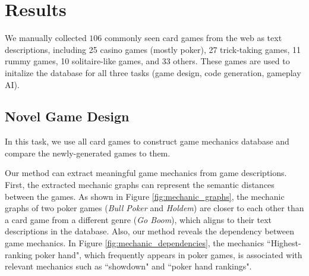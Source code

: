 \section{Results}

We manually collected $106$ commonly seen card games from the web as text descriptions, including 25 casino games (mostly poker), 27 trick-taking games, 11 rummy games, 10 solitaire-like games, and 33 others. These games are used to initalize the database for all three tasks (game design, code generation, gameplay AI).

\subsection{Novel Game Design}

In this task, we use all card games to construct game mechanics database and compare the newly-generated games to them.

Our method can extract meaningful game mechanics from game descriptions. 
First, the extracted mechanic graphs can represent the semantic distances between the games. As shown in Figure \ref{fig:mechanic_graphs}, the mechanic graphs of two poker games (\textit{Bull Poker} and \textit{Holdem}) are closer to each other than a card game from a different genre (\textit{Go Boom}), which aligns to their text descriptions in the database. Also, our method reveals the dependency between game mechanics. In Figure \ref{fig:mechanic_dependencies}, the mechanics ``Highest-ranking poker hand", which frequently appears in poker games, is associated with relevant mechanics such as ``showdown" and ``poker hand rankings". 


